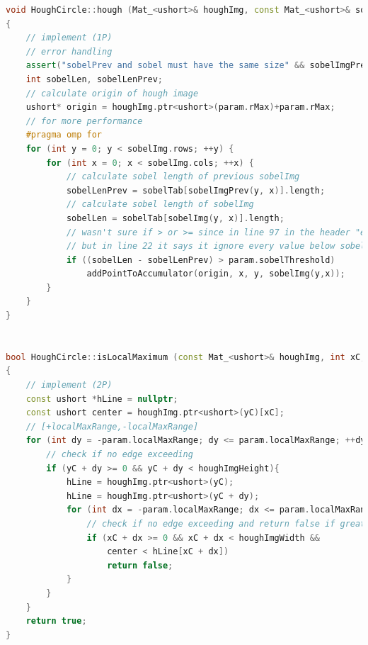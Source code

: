 \documentclass{ezb}
\begin{document}
\newpage
\begin{lstlisting}[language=C++]
void HoughCircle::hough (Mat_<ushort>& houghImg, const Mat_<ushort>& sobelImgPrev, const Mat_<ushort>& sobelImg) const
{
    // implement (1P)
	// error handling
	assert("sobelPrev and sobel must have the same size" && sobelImgPrev.rows == sobelImg.rows && sobelImgPrev.cols == sobelImg.cols);
	int sobelLen, sobelLenPrev;
	// calculate origin of hough image
	ushort* origin = houghImg.ptr<ushort>(param.rMax)+param.rMax;
	// for more performance
	#pragma omp for
	for (int y = 0; y < sobelImg.rows; ++y) {
		for (int x = 0; x < sobelImg.cols; ++x) {
			// calculate sobel length of previous sobelImg
			sobelLenPrev = sobelTab[sobelImgPrev(y, x)].length;
			// calculate sobel length of sobelImg
			sobelLen = sobelTab[sobelImg(y, x)].length;
			// wasn't sure if > or >= since in line 97 in the header "exceed" is written
			// but in line 22 it says it ignore every value below sobelThreshold
			if ((sobelLen - sobelLenPrev) > param.sobelThreshold)
				addPointToAccumulator(origin, x, y, sobelImg(y,x));
		}
	}
}


bool HoughCircle::isLocalMaximum (const Mat_<ushort>& houghImg, int xC, int yC) const
{
    // implement (2P)
	const ushort *hLine = nullptr;
	const ushort center = houghImg.ptr<ushort>(yC)[xC];
	// [+localMaxRange,-localMaxRange]
	for (int dy = -param.localMaxRange; dy <= param.localMaxRange; ++dy) {
		// check if no edge exceeding
		if (yC + dy >= 0 && yC + dy < houghImgHeight){
			hLine = houghImg.ptr<ushort>(yC);
			hLine = houghImg.ptr<ushort>(yC + dy);
			for (int dx = -param.localMaxRange; dx <= param.localMaxRange; ++dx) {
				// check if no edge exceeding and return false if greater value was found
				if (xC + dx >= 0 && xC + dx < houghImgWidth &&
					center < hLine[xC + dx])
					return false;
			}
		}
	}
	return true;
}

\end{lstlisting}
\newpage
\end{document}
